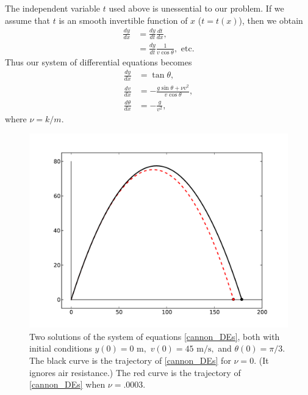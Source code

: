 The independent variable $t$ used above is unessential to our problem. If we assume that $t$ is an smooth invertible function of $x$ ($t = t(x)$), then we obtain 
\begin{align*}
\frac{dy}{dx} &= \frac{dy}{dt}\frac{dt}{dx} ,\\
&= \frac{dy}{dt} \frac{1}{v\cos{\theta}}, \text{  etc.}
\end{align*}
Thus our system of differential equations becomes 
\begin{align}
\frac{dy}{dx} &= \tan {\theta} ,\nonumber\\
\frac{dv}{dx} &= -\frac{g \sin{\theta} + \nu v^2}{v \cos{\theta}},\nonumber\\
\frac{d\theta}{dx} &= -\frac{g}{v^2}, \label{cannon_DEs}
\end{align}
where $\nu = k/m.$
\begin{figure}[ht]
\centering
\includegraphics[width=\textwidth]{Cannon_with_AirResistance.pdf}
\caption{Two solutions of the system of equations \eqref{cannon_DEs}, both with initial conditions  $y(0) = 0 \text{ m},$ $ v(0) = 45 \text{ m/s},$ and $\theta(0)=\pi/3$. The black curve is the trajectory of \eqref{cannon_DEs} for $\nu = 0.$ (It ignores air resistance.) The red curve is the trajectory of \eqref{cannon_DEs} when $\nu = .0003$. }
\label{shooting:cannonprob}
\end{figure}

